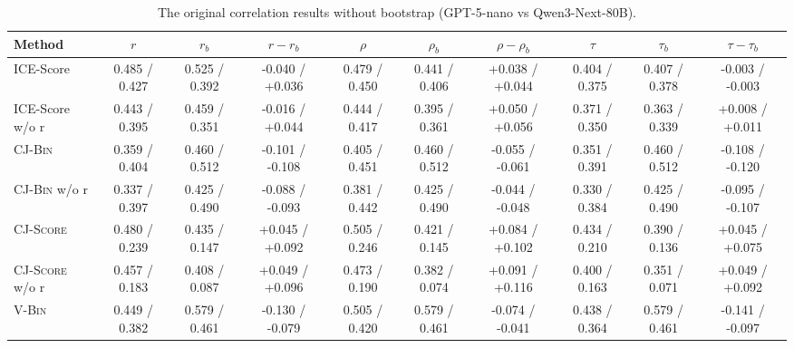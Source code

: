 \begin{table}[t]
    \centering
    \scriptsize
    \setlength{\tabcolsep}{3.5pt}
    \caption{The original correlation results without bootstrap (GPT-5-nano vs Qwen3-Next-80B).}
    \label{tab:unified-settings-models}
    \begin{tabular}{@{}
        l|ccc|ccc|ccc@{}}
        \toprule
        Method & $r$ & $r_b$ & $r-r_b$ & $\rho$ & $\rho_b$ & $\rho-\rho_b$ & $\tau$ & $\tau_b$ & $\tau-\tau_b$ \\
        \midrule
        \midrule
        ICE-Score               & 0.485 / 0.427   & 0.525 / 0.392   & -0.040 / +0.036                     & 0.479 / 0.450   & 0.441 / 0.406   & +0.038 / +0.044                     & 0.404 / 0.375   & 0.407 / 0.378   & -0.003 / -0.003                     \\
        ICE-Score w/o r         & 0.443 / 0.395   & 0.459 / 0.351   & -0.016 / +0.044                     & 0.444 / 0.417   & 0.395 / 0.361   & +0.050 / +0.056                     & 0.371 / 0.350   & 0.363 / 0.339   & +0.008 / +0.011                     \\
        \midrule
        \textsc{CJ-Bin}         & 0.359 / 0.404   & 0.460 / 0.512   & -0.101 / -0.108                     & 0.405 / 0.451   & 0.460 / 0.512   & -0.055 / -0.061                     & 0.351 / 0.391   & 0.460 / 0.512   & -0.108 / -0.120                     \\
        \textsc{CJ-Bin} w/o r   & 0.337 / 0.397   & 0.425 / 0.490   & -0.088 / -0.093                     & 0.381 / 0.442   & 0.425 / 0.490   & -0.044 / -0.048                     & 0.330 / 0.384   & 0.425 / 0.490   & -0.095 / -0.107                     \\
        \textsc{CJ-Score}       & 0.480 / 0.239   & 0.435 / 0.147   & +0.045 / +0.092                     & 0.505 / 0.246   & 0.421 / 0.145   & +0.084 / +0.102                     & 0.434 / 0.210   & 0.390 / 0.136   & +0.045 / +0.075                     \\
        \textsc{CJ-Score} w/o r & 0.457 / 0.183   & 0.408 / 0.087   & +0.049 / +0.096                     & 0.473 / 0.190   & 0.382 / 0.074   & +0.091 / +0.116                     & 0.400 / 0.163   & 0.351 / 0.071   & +0.049 / +0.092                     \\
        \midrule
        \textsc{V-Bin}          & 0.449 / 0.382   & 0.579 / 0.461   & -0.130 / -0.079                     & 0.505 / 0.420   & 0.579 / 0.461   & -0.074 / -0.041                     & 0.438 / 0.364   & 0.579 / 0.461   & -0.141 / -0.097                     \\

\end{tabular}
\end{table}
